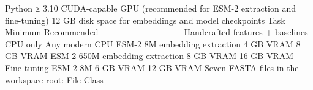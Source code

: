 {}\markdownRendererUlBeginTight
\markdownRendererUlItem Python ≥ 3.10\markdownRendererUlItemEnd 
\markdownRendererUlItem CUDA-capable GPU (recommended for ESM-2 extraction and fine-tuning)\markdownRendererUlItemEnd 
\markdownRendererUlItem \markdownRendererTilde{}12 GB disk space for embeddings and model checkpoints\markdownRendererUlItemEnd 
\markdownRendererUlEndTight \markdownRendererInterblockSeparator
{}
\markdownRendererSectionEnd \markdownRendererSectionBegin
{}\markdownRendererInterblockSeparator
{}\markdownRendererInterblockSeparator
{}
\markdownRendererSectionEnd \markdownRendererSectionBegin
{}\markdownRendererInterblockSeparator
{}\markdownRendererInterblockSeparator
{}
\markdownRendererSectionEnd \markdownRendererSectionBegin
{}\markdownRendererInterblockSeparator
{}\markdownRendererPipe{} Task \markdownRendererPipe{} Minimum \markdownRendererPipe{} Recommended \markdownRendererPipe{}\markdownRendererSoftLineBreak
{}\markdownRendererPipe{}------\markdownRendererPipe{}---------\markdownRendererPipe{}-------------\markdownRendererPipe{}\markdownRendererSoftLineBreak
{}\markdownRendererPipe{} Handcrafted features + baselines \markdownRendererPipe{} CPU only \markdownRendererPipe{} Any modern CPU \markdownRendererPipe{}\markdownRendererSoftLineBreak
{}\markdownRendererPipe{} ESM-2 8M embedding extraction \markdownRendererPipe{} 4 GB VRAM \markdownRendererPipe{} 8 GB VRAM \markdownRendererPipe{}\markdownRendererSoftLineBreak
{}\markdownRendererPipe{} ESM-2 650M embedding extraction \markdownRendererPipe{} 8 GB VRAM \markdownRendererPipe{} 16 GB VRAM \markdownRendererPipe{}\markdownRendererSoftLineBreak
{}\markdownRendererPipe{} Fine-tuning ESM-2 8M \markdownRendererPipe{} 6 GB VRAM \markdownRendererPipe{} 12 GB VRAM \markdownRendererPipe{}\markdownRendererInterblockSeparator
{}\markdownRendererThematicBreak{}\markdownRendererInterblockSeparator
{}
\markdownRendererSectionEnd 
\markdownRendererSectionEnd \markdownRendererSectionBegin
{}\markdownRendererInterblockSeparator
{}Seven FASTA files in the workspace root:\markdownRendererParagraphSeparator
{}\markdownRendererPipe{} File \markdownRendererPipe{} Class \markdownRendererPipe{}\markdownRendererSoftLineBreak
